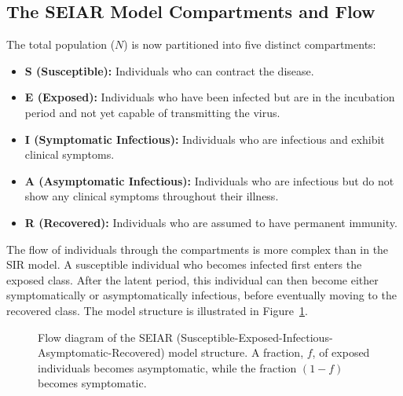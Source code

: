 \documentclass[12pt, a4paper]{article}
\begin{document}
\subsection{The SEIAR Model Compartments and Flow}
The total population ($N$) is now partitioned into five distinct compartments:
\begin{itemize}
    \item \textbf{S (Susceptible):} Individuals who can contract the disease.
    \item \textbf{E (Exposed):} Individuals who have been infected but are in the incubation period and not yet capable of transmitting the virus.
    \item \textbf{I (Symptomatic Infectious):} Individuals who are infectious and exhibit clinical symptoms.
    \item \textbf{A (Asymptomatic Infectious):} Individuals who are infectious but do not show any clinical symptoms throughout their illness.
    \item \textbf{R (Recovered):} Individuals who are assumed to have permanent immunity.
\end{itemize}
The flow of individuals through the compartments is more complex than in the SIR model. A susceptible individual who becomes infected first enters the exposed class. After the latent period, this individual can then become either symptomatically or asymptomatically infectious, before eventually moving to the recovered class. The model structure is illustrated in Figure~\ref{fig:seiar_flow_part2}.

\begin{figure}[h!]
\centering
{}
\caption{Flow diagram of the SEIAR (Susceptible-Exposed-Infectious-Asymptomatic-Recovered) model structure. A fraction, $f$, of exposed individuals becomes asymptomatic, while the fraction $(1-f)$ becomes symptomatic.}
\label{fig:seiar_flow_part2}
\end{figure}
\end{document}
